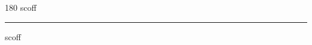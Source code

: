 
\begin{frame}
\begin{center}
\begin{turn}{180}
{\fontsize{2.5cm}{1em}\selectfont scoff}
\end{turn}
\vspace{1em}\par  
\hrule
\vspace{1em}\par  
{\fontsize{2.5cm}{1em}\selectfont scoff}
\end{center}
\end{frame}
